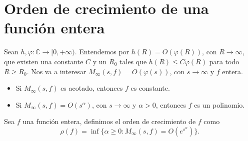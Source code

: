 \section{Orden de crecimiento de una función entera}
Sean $h, \varphi: \mathbb{C} \to [0, +\infty)$.
Entendemos por $h(R) = O(\varphi(R))$, con $R \to \infty$, que existen una constante $C$ y un $R_0$ tales que $h(R) \leq C\varphi(R)$ para todo $R \geq R_0$.
Nos va a interesar $M_\infty(s, f) = O(\varphi(s))$, con $s \to \infty$ y $f$ entera.
\begin{itemize}
    \item Si $M_\infty(s, f)$ es acotado, entonces $f$ es constante.
    \item Si $M_\infty(s, f) = O(s^\alpha)$, con $s \to \infty$ y $\alpha > 0$, entonces $f$ es un polinomio.
\end{itemize}

\begin{definition}
    Sea $f$ una función entera, definimos el orden de crecimiento de $f$ como
    $$\rho(f) = \inf\{\alpha \geq 0 : M_\infty(s, f) = O(e^{s^\alpha})\}.$$
\end{definition}

